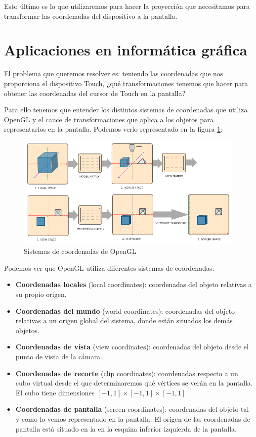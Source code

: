\documentclass[a4paper,11pt, oneside]{book}
\begin{document}
Esto último es lo que utilizaremos para hacer la proyección que necesitamos para transformar las coordenadas del dispositivo a la pantalla.


\section{Aplicaciones en informática gráfica}

El problema que queremos resolver es: teniendo las coordenadas que nos proporciona el dispositivo Touch, ¿qué transformaciones tenemos que hacer para obtener las coordenadas del cursor de Touch en la pantalla?


Para ello tenemos que entender los distintos sistemas de coordenadas que utiliza OpenGL y el cauce de transformaciones que aplica a los objetos para representarlos en la pantalla\cite{coordinates}. Podemos verlo representado en 
la figura \ref{fig:coordinates}:
\begin{figure}[H]
	\centering
	\includegraphics[width=\linewidth]{coordinate_systems}
	\caption{Sistemas de coordenadas de OpenGL}
	\label{fig:coordinates}
	
\end{figure}


Podemos ver que OpenGL utiliza diferentes sistemas de coordenadas:
\begin{itemize}
	\item \textbf{Coordenadas locales} (local coordinates): coordenadas del objeto relativas a su propio origen.
	\item \textbf{Coordenadas del mundo} (world coordinates): coordenadas del objeto relativas a un origen global del sistema, donde están situados los demás objetos.
	\item \textbf{Coordenadas de vista} (view coordinates): coordenadas del objeto desde el punto de vista de la cámara.
	\item \textbf{Coordenadas de recorte} (clip coordinates): coordenadas respecto a un cubo virtual desde el que determinaremos qué vértices se verán en la pantalla. El cubo tiene dimensiones $[-1,1]\times [-1,1]\times [-1,1]$.
	\item \textbf{Coordenadas de pantalla} (screen coordinates): coordenadas del objeto tal y como lo vemos representado en la pantalla. El origen de las coordenadas de pantalla está situado en la en la esquina inferior izquierda de la pantalla.
\end{itemize} 
\end{document}
